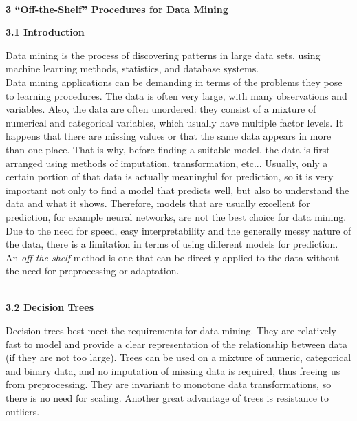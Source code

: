 \documentclass[12pt, letterpaper, twoside]{article}
\begin{document}
\begin{center}
\textbf{\large{\\3 “Off-the-Shelf” Procedures for Data Mining}\\}
\end{center}
\begin{center}
\textbf{\large{3.1 Introduction}\\}
\end{center}
\hspace*{4ex}Data mining is the process of discovering patterns in large data sets, using machine learning methods, statistics, and database systems.\\ 
\hspace*{4ex}Data mining applications can be demanding in terms of the problems they pose to learning procedures. The data is often very large, with many observations and variables. Also, the data are often unordered: they consist of a mixture of numerical and categorical variables, which usually have multiple factor levels. It happens that there are missing values or that the same data appears in more than one place. That is why, before finding a suitable model, the data is first arranged using methods of imputation, transformation, etc... Usually, only a certain portion of that data is actually meaningful for prediction, so it is very important not only to find a model that predicts well, but also to understand the data and what it shows. Therefore, models that are usually excellent for prediction, for example neural networks, are not the best choice for data mining. 
\hspace*{4ex}Due to the need for speed, easy interpretability and the generally messy nature of the data, there is a limitation in terms of using different models for prediction. An \emph{off-the-shelf} method is one that can be directly applied to the data without the need for preprocessing or adaptation.
\pagebreak
\begin{center}
\textbf{\large{\\3.2 Decision Trees}\\}
\end{center}
\hspace*{4ex}Decision trees best meet the requirements for data mining. They are relatively fast to model and provide a clear representation of the relationship between data (if they are not too large). Trees can be used on a mixture of numeric, categorical and binary data, and no imputation of missing data is required, thus freeing us from preprocessing. They are invariant to monotone data transformations, so there is no need for scaling. Another great advantage of trees is resistance to outliers.\\
\end{document}
